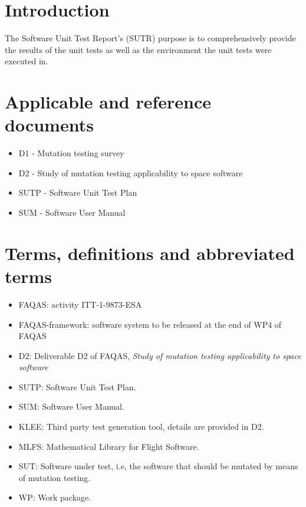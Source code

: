 
\chapter{Introduction}

The Software Unit Test Report’s (SUTR) purpose is to comprehensively provide the results of the unit tests as well as the environment the unit tests were executed in.

\chapter{Applicable and reference documents}


\begin{itemize}
\item{D1 - Mutation testing survey}
\item{D2 - Study of mutation testing applicability to space software}
\item{SUTP - Software Unit Test Plan}
\item{SUM - Software User Manual}


\end{itemize}

\chapter{Terms, definitions and abbreviated terms}

\begin{itemize}
\item{FAQAS}: activity ITT-1-9873-ESA
\item{FAQAS-framework}: software system to be released at the end of WP4 of FAQAS
\item{D2}: Deliverable D2 of FAQAS, \emph{Study of mutation testing applicability to space software}
\item{SUTP}: Software Unit Test Plan.
\item{SUM}: Software User Manual.
\item{KLEE}: Third party test generation tool, details are provided in D2.
\item{MLFS}: Mathematical Library for Flight Software.
\item{SUT}: Software under test, i.e, the software that should be mutated by means of mutation testing.
\item{WP}: Work package.

\end{itemize}


\clearpage
